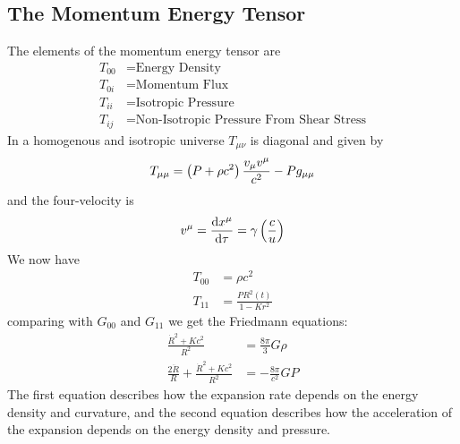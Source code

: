 \subsection{The Momentum Energy Tensor}
The elements of the momentum energy tensor are
\begin{align}
    T_{00} &= \text{Energy Density} \\
    T_{0i} &= \text{Momentum Flux} \\
    T_{ii} &= \text{Isotropic Pressure} \\
    T_{ij} &= \text{Non-Isotropic Pressure From Shear Stress}
\end{align}
In a homogenous and isotropic universe \(T_{\mu\nu}\) is diagonal and given by
\begin{equation}
    T_{\mu\mu} = \left(P+\rho c^2\right)\frac{v_\mu v^\mu}{c^2} - P g_{\mu\mu}
\end{equation}
and the four-velocity is
\begin{equation}
    v^\mu = \diff{x^\mu}{\tau} = \gamma \ins{\frac{c}{u}}
\end{equation}
We now have 
\begin{align}
    T_{00} &= \rho c^2 \\
    T_{11} &= \frac{P R^2(t)}{1-Kr^2}
\end{align}
comparing with \(G_{00}\) and \(G_{11}\) we get the Friedmann equations:
\begin{align}
    \frac{\dot{R}^2+Kc^2}{R^2} &= \frac{8\pi}{3}G\rho \\
    \frac{2\ddot{R}}{R} + \frac{\dot{R}^2 + Kc^2}{R^2} &= -\frac{8\pi}{c^2} GP
\end{align}
The first equation describes how the expansion rate depends on the energy density and curvature, and the second equation describes how the acceleration of the expansion depends on the energy density and pressure.